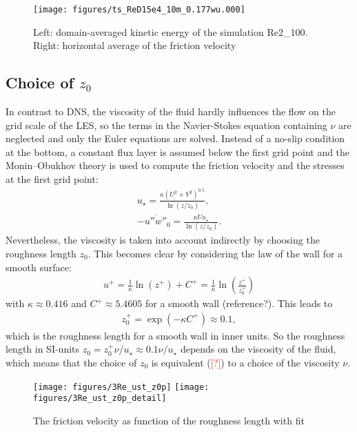 \documentclass[a4paper,11pt]{article}
\newcommand{\todo}[1]{\textcolor{red}{$[$#1$]$}}
\begin{document}
\begin{figure}
  \centerline{\texttt{[image: figures/ts\_ReD15e4\_10m\_0.177wu.000]}}
  \caption{Left: domain-averaged kinetic energy of the simulation Re2\_100. Right: horizontal average of the friction velocity}
  \label{E_ts}
\end{figure}

\subsection{Choice of $z_0$}

In contrast to DNS, the viscosity of the fluid hardly influences the flow on the grid scale of the LES, so the terms in the Navier-Stokes equation containing $\nu$ are neglected and only the Euler equations are solved. Instead of a no-slip condition at the bottom, a constant flux layer is assumed below the first grid point and the Monin--Obukhov theory is used to compute the friction velocity and the stresses at the first grid point:
\begin{align}\label{most}
  u_\star = \frac{\kappa(U^2+V^2)^{0.5}}{\ln\left(z/z_0\right)},\\
  -\overline{u''w''}_0 = \frac{\kappa Uu_\star}{\ln\left(z/z_0\right)}.
\end{align}
Nevertheless, the viscosity is taken into account indirectly by choosing the roughness length $z_0$. This becomes clear by considering the law of the wall for a smooth surface:
\begin{align}
  u^+ = \frac{1}{\kappa}\ln(z^+) + C^+ = \frac{1}{\kappa}\ln\left(\frac{z^+}{z_0^+}\right)
\end{align}
with $\kappa\approx0.416$ and $C^+\approx 5.4605$ for a smooth wall (reference?). This leads to
\begin{align}
	z_0^+ = \exp\left(-\kappa C^+\right) \approx 0.1,
\end{align}
which is the roughness length for a smooth wall in inner units. So the roughness length in SI-units $z_0 = z_0^+\nu/u_\star\approx 0.1\nu/u_\star$ depends on the viscosity of the fluid, which means that the choice of $z_0$ is equivalent (\todo{?}) to a choice of the viscosity $\nu$.

\begin{figure}
  \centerline{\texttt{[image: figures/3Re\_ust\_z0p]}
	\texttt{[image: figures/3Re\_ust\_z0p\_detail]}}
  \caption{The friction velocity as function of the roughness length with fit}
  \label{ust_z0p}
\end{figure}
\end{document}
